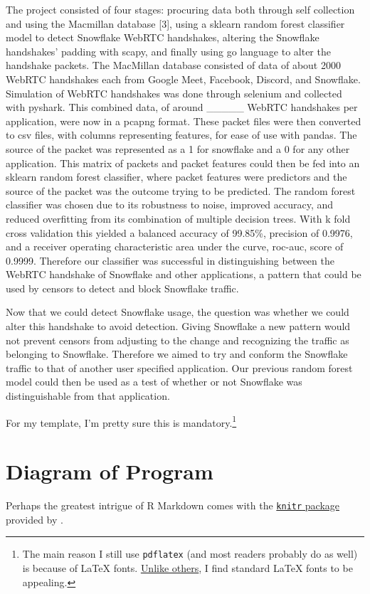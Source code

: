 \documentclass[11pt,]{article}
\begin{document}
The project consisted of four stages: procuring data both through self
collection and using the Macmillan database {[}3{]}, using a sklearn
random forest classifier model to detect Snowflake WebRTC handshakes,
altering the Snowflake handshakes' padding with scapy, and finally using
go language to alter the handshake packets. The MacMillan database
consisted of data of about 2000 WebRTC handshakes each from Google Meet,
Facebook, Discord, and Snowflake. Simulation of WebRTC handshakes was
done through selenium and collected with pyshark. This combined data, of
around \_\_\_\_\_ WebRTC handshakes per application, were now in a
pcapng format. These packet files were then converted to csv files, with
columns representing features, for ease of use with pandas. The source
of the packet was represented as a 1 for snowflake and a 0 for any other
application. This matrix of packets and packet features could then be
fed into an sklearn random forest classifier, where packet features were
predictors and the source of the packet was the outcome trying to be
predicted. The random forest classifier was chosen due to its robustness
to noise, improved accuracy, and reduced overfitting from its
combination of multiple decision trees. With k fold cross validation
this yielded a balanced accuracy of 99.85\%, precision of 0.9976, and a
receiver operating characteristic area under the curve, roc-auc, score
of 0.9999. Therefore our classifier was successful in distinguishing
between the WebRTC handshake of Snowflake and other applications, a
pattern that could be used by censors to detect and block Snowflake
traffic.

Now that we could detect Snowflake usage, the question was whether we
could alter this handshake to avoid detection. Giving Snowflake a new
pattern would not prevent censors from adjusting to the change and
recognizing the traffic as belonging to Snowflake. Therefore we aimed to
try and conform the Snowflake traffic to that of another user specified
application. Our previous random forest model could then be used as a
test of whether or not Snowflake was distinguishable from that
application.

For my template, I'm pretty sure this is mandatory.\footnote{The main
  reason I still use \texttt{pdflatex} (and most readers probably do as
  well) is because of LaTeX fonts.
  \href{http://www-rohan.sdsu.edu/~aty/bibliog/latex/gripe.html}{Unlike
  others}, I find standard LaTeX fonts to be appealing.}

\section{Diagram of Program}\label{diagram-of-program}

Perhaps the greatest intrigue of R Markdown comes with the
\href{http://yihui.name/knitr/}{\texttt{knitr} package} provided by
\citet{xie2013ddrk}.





\newpage
\singlespacing 

\end{document}
